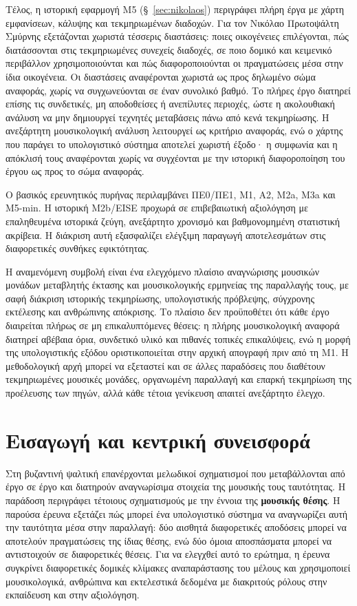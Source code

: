 \documentclass[11pt,a4paper]{article}
\begin{document}
Τέλος, η ιστορική εφαρμογή M5 (§~\ref{sec:nikolaos}) περιγράφει πλήρη έργα με χάρτη εμφανίσεων, κάλυψης και τεκμηριωμένων διαδοχών. Για τον Νικόλαο Πρωτοψάλτη Σμύρνης εξετάζονται χωριστά τέσσερις διαστάσεις: ποιες οικογένειες επιλέγονται, πώς διατάσσονται στις τεκμηριωμένες συνεχείς διαδοχές, σε ποιο δομικό και κειμενικό περιβάλλον χρησιμοποιούνται και πώς διαφοροποιούνται οι πραγματώσεις μέσα στην ίδια οικογένεια. Οι διαστάσεις αναφέρονται χωριστά ως προς δηλωμένο σώμα αναφοράς, χωρίς να συγχωνεύονται σε έναν συνολικό βαθμό. Το πλήρες έργο διατηρεί επίσης τις συνδετικές, μη αποδοθείσες ή ανεπίλυτες περιοχές, ώστε η ακολουθιακή ανάλυση να μην δημιουργεί τεχνητές μεταβάσεις πάνω από κενά τεκμηρίωσης. Η ανεξάρτητη μουσικολογική ανάλυση λειτουργεί ως κριτήριο αναφοράς, ενώ ο χάρτης που παράγει το υπολογιστικό σύστημα αποτελεί χωριστή έξοδο· η συμφωνία και η απόκλισή τους αναφέρονται χωρίς να συγχέονται με την ιστορική διαφοροποίηση του έργου ως προς το σώμα αναφοράς.

Ο βασικός ερευνητικός πυρήνας περιλαμβάνει ΠΕ0/ΠΕ1, Μ1, Α2, Μ2a, Μ3a και Μ5-min. Η ιστορική Μ2b/EISE προχωρά σε επιβεβαιωτική αξιολόγηση με επαληθευμένα ιστορικά ζεύγη, ανεξάρτητο χρονισμό και βαθμονομημένη στατιστική ακρίβεια. Η διάκριση αυτή εξασφαλίζει ελέγξιμη παραγωγή αποτελεσμάτων στις διαφορετικές συνθήκες εφικτότητας.

Η αναμενόμενη συμβολή είναι ένα ελεγχόμενο πλαίσιο αναγνώρισης μουσικών μονάδων μεταβλητής έκτασης και μουσικολογικής ερμηνείας της παραλλαγής τους, με σαφή διάκριση ιστορικής τεκμηρίωσης, υπολογιστικής πρόβλεψης, σύγχρονης εκτέλεσης και ανθρώπινης απόκρισης. Το πλαίσιο δεν προϋποθέτει ότι κάθε έργο διαιρείται πλήρως σε μη επικαλυπτόμενες θέσεις: η πλήρης μουσικολογική αναφορά διατηρεί αβέβαια όρια, συνδετικό υλικό και πιθανές τοπικές επικαλύψεις, ενώ η μορφή της υπολογιστικής εξόδου οριστικοποιείται στην αρχική απογραφή πριν από τη M1. Η μεθοδολογική αρχή μπορεί να εξεταστεί και σε άλλες παραδόσεις που διαθέτουν τεκμηριωμένες μουσικές μονάδες, οργανωμένη παραλλαγή και επαρκή τεκμηρίωση της προέλευσης των πηγών, αλλά κάθε τέτοια γενίκευση απαιτεί ανεξάρτητο έλεγχο.

\clearpage
\setcounter{tocdepth}{1}
\tableofcontents
\clearpage

\section{Εισαγωγή και κεντρική συνεισφορά}

Στη βυζαντινή ψαλτική επανέρχονται μελωδικοί σχηματισμοί που μεταβάλλονται από έργο σε έργο και διατηρούν αναγνωρίσιμα στοιχεία της μουσικής τους ταυτότητας. Η παράδοση περιγράφει τέτοιους σχηματισμούς με την έννοια της \textbf{μουσικής θέσης}. Η παρούσα έρευνα εξετάζει πώς μπορεί ένα υπολογιστικό σύστημα να αναγνωρίζει αυτή την ταυτότητα μέσα στην παραλλαγή: δύο αισθητά διαφορετικές αποδόσεις μπορεί να αποτελούν πραγματώσεις της ίδιας θέσης, ενώ δύο όμοια αποσπάσματα μπορεί να αντιστοιχούν σε διαφορετικές θέσεις. Για να ελεγχθεί αυτό το ερώτημα, η έρευνα συγκρίνει διαφορετικές δομικές κλίμακες αναπαράστασης του μέλους και χρησιμοποιεί μουσικολογικά, ανθρώπινα και εκτελεστικά δεδομένα με διακριτούς ρόλους στην εκπαίδευση και στην αξιολόγηση.
\end{document}
